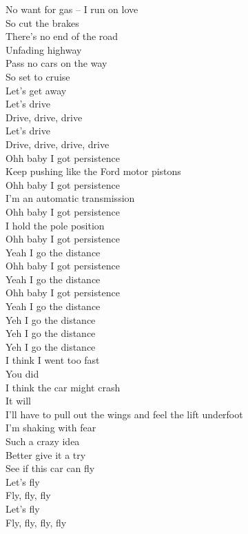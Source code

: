 No want for gas -- I run on love \\
So cut the brakes \\
There's no end of the road \\
Unfading highway \\
Pass no cars on the way \\
So set to cruise \\
Let's get away \\

Let's drive \\
Drive, drive, drive \\
Let's drive \\
Drive, drive, drive, drive \\

Ohh baby I got persistence \\
Keep pushing like the Ford motor pistons \\
Ohh baby I got persistence \\
I'm an automatic transmission \\
Ohh baby I got persistence \\
I hold the pole position \\
Ohh baby I got persistence \\
Yeah I go the distance \\
Ohh baby I got persistence \\
Yeah I go the distance \\
Ohh baby I got persistence \\
Yeah I go the distance \\

Yeh I go the distance \\
Yeh I go the distance \\
Yeh I go the distance \\

I think I went too fast \\
You did \\
I think the car might crash \\
It will \\
I'll have to pull out the wings and feel the lift underfoot \\
I'm shaking with fear \\
Such a crazy idea \\
Better give it a try \\
See if this car can fly \\

Let's fly \\
Fly, fly, fly \\
Let's fly \\
Fly, fly, fly, fly \\


